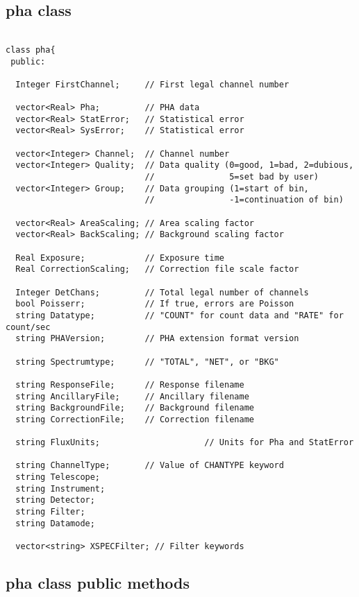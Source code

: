 \documentclass[11pt]{book}
\begin{document}
\subsection{pha class}

\begin{verbatim}

class pha{
 public:

  Integer FirstChannel;     // First legal channel number

  vector<Real> Pha;         // PHA data
  vector<Real> StatError;   // Statistical error 
  vector<Real> SysError;    // Statistical error 

  vector<Integer> Channel;  // Channel number
  vector<Integer> Quality;  // Data quality (0=good, 1=bad, 2=dubious,
                            //               5=set bad by user) 
  vector<Integer> Group;    // Data grouping (1=start of bin,
                            //               -1=continuation of bin)

  vector<Real> AreaScaling; // Area scaling factor 
  vector<Real> BackScaling; // Background scaling factor 

  Real Exposure;            // Exposure time 
  Real CorrectionScaling;   // Correction file scale factor 

  Integer DetChans;         // Total legal number of channels
  bool Poisserr;            // If true, errors are Poisson 
  string Datatype;          // "COUNT" for count data and "RATE" for count/sec 
  string PHAVersion;        // PHA extension format version 

  string Spectrumtype;      // "TOTAL", "NET", or "BKG" 

  string ResponseFile;      // Response filename 
  string AncillaryFile;     // Ancillary filename 
  string BackgroundFile;    // Background filename 
  string CorrectionFile;    // Correction filename 

  string FluxUnits;                     // Units for Pha and StatError

  string ChannelType;       // Value of CHANTYPE keyword 
  string Telescope;                                          
  string Instrument;
  string Detector;
  string Filter;
  string Datamode;

  vector<string> XSPECFilter; // Filter keywords 
\end{verbatim}

\subsection{pha class public methods}
\end{document}
